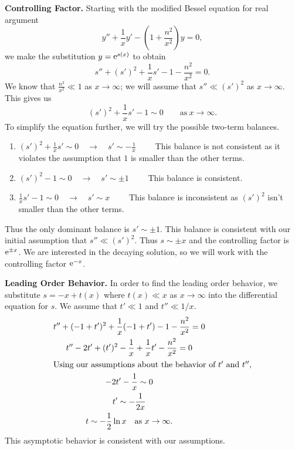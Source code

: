 {\begin{Solution}
  \textbf{Controlling Factor.}
  Starting with the modified Bessel equation for real argument
  \[ 
  y'' + \frac{1}{x} y' - \left(1 + \frac{n^2}{x^2} \right) y = 0,
  \]
  we make the substitution $y = \mathop{\mathrm{e}}\nolimits^{s(x)}$ to obtain
  \[
  s'' + (s')^2 + \frac{1}{x} s' - 1 - \frac{n^2}{x^2} = 0.
  \]
  We know that $\frac{n^2}{x^2} \ll 1$ as $x \to \infty$;  we will assume
  that $s'' \ll (s')^2$ as $x \to \infty$.  This gives us
  \[ (s')^2 + \frac{1}{x} s' - 1 \sim 0 \qquad \mathrm{as}\ x \to \infty.\]
  To simplify the equation further, we will try the possible two-term balances.
  \begin{enumerate}
  \item
    $(s')^2 + \frac{1}{x} s' \sim 0 \quad \to \quad s' \sim -\frac{1}{x} \qquad$
    This balance is not consistent as it violates the assumption that
    $1$ is smaller than the other terms.
  \item
    $(s')^2 - 1 \sim 0 \quad        \to \quad      s' \sim \pm 1 \qquad$
    This balance is consistent.
  \item
    $\frac{1}{x} s' - 1 \sim 0 \quad \to \quad s' \sim x \qquad$
    This balance is inconsistent as $(s')^2$ isn't smaller than the other terms.
  \end{enumerate}

  Thus the only dominant balance is $s' \sim \pm 1$.
  This balance is consistent with our initial assumption that $s'' \ll (s')^2$.
  Thus $s \sim \pm x$ and the controlling factor is $\mathop{\mathrm{e}}\nolimits^{\pm x}$.
  We are interested in the decaying solution, so we will work with the 
  controlling factor $\mathop{\mathrm{e}}\nolimits^{-x}$.



  \textbf{Leading Order Behavior.}
  In order to find the leading order behavior, we substitute $s = - x
  + t(x)$ where $t(x) \ll x$ as $x \to \infty$ into the differential equation
  for $s$.  We assume that $t' \ll 1$ and $t'' \ll 1/x$.
  \begin{gather*}
    t'' + (-1 + t')^2 + \frac{1}{x}(-1 + t') - 1 - \frac{n^2}{x^2} = 0 
    \\
    t'' - 2 t' + (t')^2 - \frac{1}{x} + \frac{1}{x} t' - \frac{n^2}{x^2} = 0 
    \\
    \intertext{Using our assumptions about the behavior of $t'$ and $t''$,}
    - 2 t' - \frac{1}{x} \sim 0 
    \\
    t' \sim -\frac{1}{2x} 
    \\
    t \sim - \frac{1}{2} \ln x \quad \mathrm{as}\ x \to \infty.
  \end{gather*}
  This asymptotic behavior is consistent with our assumptions.


\end{Solution}}
